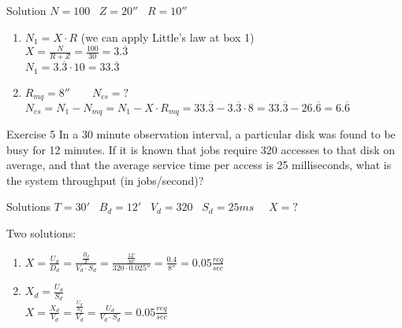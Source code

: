 \documentclass[]{beamer}
\begin{document}
\begin{frame}{Solution}
$N=100$ \ $Z=20''$ \ $R=10''$


\begin{enumerate}
	\item $N_1 = X \cdot R$ (we can apply Little's law at box 1) \\
	$X = \frac{N}{R+Z} = \frac{100}{30} = 3.\overline{3}$\\
	$N_1 = 3.\overline{3} \cdot 10 = 33.\overline{3}$
	
	\item $R_{mq}=8'' \qquad N_{cs}=?$\\
	$N_{cs} = N_1 - N_{mq} = N_1 - X \cdot R_{mq} = 33.\overline{3} - 3.\overline{3} \cdot 8 = 33.\overline{3} - 26.\overline{6} = 6.\overline{6}$
\end{enumerate}
\end{frame}

\begin{frame}{Exercise 5 \cite{lazowska1984quantitative}}
 In a 30 minute observation interval, a particular disk was found to be
busy for 12 minutes. If it is known that jobs require 320 accesses to
that disk on average, and that the average service time per access is 25
milliseconds, what is the system throughput (in jobs/second)?
\end{frame}

\begin{frame}{Solutions}
$T=30'$ \ $B_d = 12'$ \ $V_d = 320$ \ $S_d = 25ms$ \ \ $X=?$

Two solutions:
\begin{enumerate}
	\item $X = \frac{U_d}{D_d} = \frac{\frac{B_d}{T}}{V_d \cdot S_d} = \frac{\frac{12'}{30'}}{320 \cdot 0.025 ''} = \frac{0.4}{8''} = 0.05 \frac{req}{sec}$ \vspace{.5cm}
	\item $X_d = \frac{U_d}{S_d}$ \\
	$X = \frac{X_d}{V_d} = \frac{\frac{U_d}{S_d}}{V_d} = \frac{U_d}{V_d \cdot S_d} = 0.05 \frac{req}{sec}$
\end{enumerate}
\end{frame}
\end{document}
